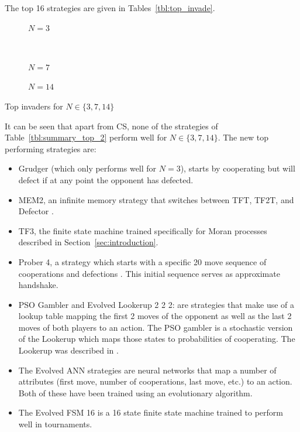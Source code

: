 \documentclass{article}
\begin{document}
The top 16 strategies are given in Tables~\ref{tbl:top_invade}.

\begin{table}[!hbtp]
    \centering
    \scriptsize
    \begin{subfigure}[t]{.5\textwidth}
        \centering
        
        \caption{\(N=3\)}
    \end{subfigure}%
    ~
    \begin{subfigure}[t]{.5\textwidth}
        \centering
        
        \caption{\(N=7\)}
    \end{subfigure}

    \begin{subfigure}[t]{.3\textwidth}
        \centering
        
        \caption{\(N=14\)}
    \end{subfigure}
    \caption{Top invaders for \(N\in\{3, 7, 14\}\)}
    \label{tbl:top_invade}
\end{table}

It can be seen that apart from CS, none of the strategies
of Table~\ref{tbl:summary_top_2} perform well for \(N\in\{3, 7, 14\}\). The new
top performing strategies are:

\begin{itemize}
    \item Grudger (which only performs well for \(N=3\)), starts by cooperating
        but will defect if at any point the opponent has defected.
    \item MEM2, an infinite memory strategy that switches between TFT, TF2T, and
        Defector \cite{Li2014}.
    \item TF3, the finite state machine trained specifically for Moran processes
        described in Section~\ref{sec:introduction}.
    \item Prober 4, a strategy which starts with a specific 20 move sequence of
        cooperations and defections \cite{prison}. This initial sequence serves
        as approximate handshake.
    \item  PSO Gambler and Evolved Lookerup 2 2 2: are strategies that make use
        of a lookup table mapping the first 2 moves of the opponent as well as
        the last 2 moves of both players to an action. The PSO gambler is a
        stochastic version of the Lookerup which maps those states to probabilities of cooperating. The Lookerup was described in \cite{Knight2016}.
    \item The Evolved ANN strategies are neural networks that map a number of
	    attributes (first move, number of cooperations, last move, etc.) to
	    an action. Both of these have been trained using an evolutionary
	    algorithm.
    \item The Evolved FSM 16 is a 16 state finite state machine trained to
        perform well in tournaments.
\end{itemize}
\end{document}
